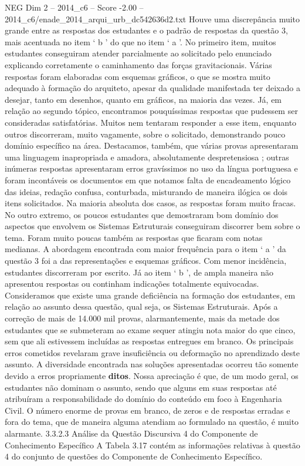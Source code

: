 \begin{textsample}{NEG Dim 2 – 2014\_c6 – Score -2.00 – 2014\_c6/enade\_2014\_arqui\_urb\_dc542636d2.txt}
Houve uma discrepância muito grande entre as respostas dos estudantes e o padrão de respostas da questão 3, mais acentuada no item ‘ b ’ do que no item ‘ a ’.
No primeiro item, muitos estudantes conseguiram atender parcialmente ao solicitado pelo enunciado explicando corretamente o caminhamento das forças gravitacionais.
Várias respostas foram elaboradas com esquemas gráficos, o que se mostra muito adequado à formação do arquiteto, apesar da qualidade manifestada ter deixado a desejar, tanto em desenhos, quanto em gráficos, na maioria das vezes.
Já, em relação ao segundo tópico, encontramos pouquíssimas respostas que pudessem ser consideradas satisfatórias.
Muitos nem tentaram responder a esse item, enquanto outros discorreram, muito vagamente, sobre o solicitado, demonstrando pouco domínio específico na área.
Destacamos, também, que várias provas apresentaram uma linguagem inapropriada e amadora, absolutamente despretensiosa ; outras inúmeras respostas apresentaram erros gravíssimos no uso da língua portuguesa e foram incontáveis os documentos em que notamos falta de encadeamento lógico das ideias, redação confusa, conturbada, misturando de maneira ilógica os dois itens solicitados.
Na maioria absoluta dos casos, as respostas foram muito fracas.
No outro extremo, os poucos estudantes que demostraram bom domínio dos aspectos que envolvem os Sistemas Estruturais conseguiram discorrer bem sobre o tema.
Foram muito poucas também as respostas que ficaram com notas medianas.
A abordagem encontrada com maior frequência para o item ‘ a ’ da questão 3 foi a das representações e esquemas gráficos.
Com menor incidência, estudantes discorreram por escrito.
Já ao item ‘ b ’, de ampla maneira não apresentou respostas ou continham indicações totalmente equivocadas.
Consideramos que existe uma grande deficiência na formação dos estudantes, em relação ao assunto dessa questão, qual seja, os Sistemas Estruturais.
Após a correção de mais de 14.000 mil provas, alarmantemente, mais da metade dos estudantes que se submeteram ao exame sequer atingiu nota maior do que cinco, sem que ali estivessem incluídas as respostas entregues em branco.
Os principais erros cometidos revelaram grave insuficiência ou deformação no aprendizado deste assunto.
A diversidade encontrada nas soluções apresentadas ocorreu tão somente devido a erros propriamente \textbf{ditos}.
Nossa apreciação é que, de um modo geral, os estudantes não dominam o assunto, sendo que alguns em suas respostas até atribuíram a responsabilidade do domínio do conteúdo em foco à Engenharia Civil.
O número enorme de provas em branco, de zeros e de respostas erradas e fora do tema, que de maneira alguma atendiam ao formulado na questão, é muito alarmante. 3.3.2.3 Análise da Questão Discursiva 4 do Componente de Conhecimento Específico A Tabela 3.17 contém as informações relativas à questão 4 do conjunto de questões do Componente de Conhecimento Específico.

\end{textsample}
